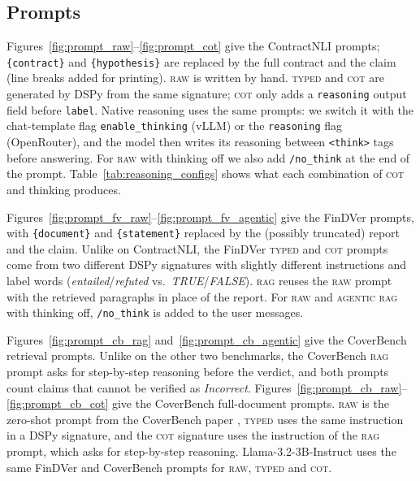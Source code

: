 \documentclass[11pt]{article}
\newcommand{\typed}{\textsc{typed}}
\begin{document}
\subsection{Prompts}
\label{sec:prompts}

Figures~\ref{fig:prompt_raw}--\ref{fig:prompt_cot} give the ContractNLI
prompts; \texttt{\{contract\}} and \texttt{\{hypothesis\}} are replaced by
the full contract and the claim (line breaks added for printing).
\textsc{raw} is written by hand. \typed{} and \textsc{cot} are generated by
DSPy from the same signature; \textsc{cot} only adds a \texttt{reasoning}
output field before \texttt{label}. Native reasoning uses the same prompts:
we switch it with the chat-template flag \texttt{enable\_thinking} (vLLM)
or the \texttt{reasoning} flag (OpenRouter), and the model then writes its
reasoning between \texttt{<think>} tags before answering. For \textsc{raw}
with thinking off we also add \texttt{/no\_think} at the end of the prompt.
Table~\ref{tab:reasoning_configs} shows what each combination of
\textsc{cot} and thinking produces.

Figures~\ref{fig:prompt_fv_raw}--\ref{fig:prompt_fv_agentic} give the
FinDVer prompts, with \texttt{\{document\}} and \texttt{\{statement\}}
replaced by the (possibly truncated) report and the claim. Unlike on
ContractNLI, the FinDVer \typed{} and \textsc{cot} prompts come from two
different DSPy signatures with slightly different instructions and label
words (\textit{entailed}/\textit{refuted} vs.\ \textit{TRUE}/\textit{FALSE}).
\textsc{rag} reuses the \textsc{raw} prompt with the retrieved paragraphs in
place of the report. For \textsc{raw} and \textsc{agentic rag} with
thinking off, \texttt{/no\_think} is added to the user messages.

Figures~\ref{fig:prompt_cb_rag} and~\ref{fig:prompt_cb_agentic} give the
CoverBench retrieval prompts. Unlike on the other two benchmarks, the
CoverBench \textsc{rag} prompt asks for step-by-step reasoning before the
verdict, and both prompts count claims that cannot be verified as
\textit{Incorrect}. Figures~\ref{fig:prompt_cb_raw}--\ref{fig:prompt_cb_cot}
give the CoverBench full-document prompts. \textsc{raw} is the zero-shot
prompt from the CoverBench paper \citep{jacovi2024coverbench}, \typed{}
uses the same instruction in a DSPy signature, and the \textsc{cot}
signature uses the instruction of the \textsc{rag} prompt, which asks for
step-by-step reasoning. Llama-3.2-3B-Instruct uses the same FinDVer and
CoverBench prompts for \textsc{raw}, \typed{} and \textsc{cot}.
\end{document}
